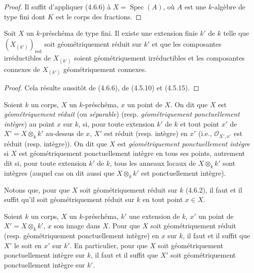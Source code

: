 \begin{proof}
Il suffit d'appliquer (4.6.6) à $X=\operatorname{Spec}(A)$, où $A$ est une
$k$-algèbre de type fini dont $K$ est le corps des fractions.
\end{proof}

\begin{corollary}[4.6.8]
\label{IV.2.4.6.8-fr}
Soit $X$ un $k$-préschéma de type fini. Il existe une extension finie $k'$ de
$k$ telle que $(X_{(k')})_{\mathrm{red}}$ soit géométriquement réduit sur $k'$
et que les composantes irréductibles de $X_{(k')}$ soient géométriquement
irréductibles et les composantes connexes de $X_{(k')}$ géométriquement
connexes.
\end{corollary}

\begin{proof}
Cela résulte aussitôt de (4.6.6), de (4.5.10) et (4.5.15).
\end{proof}

\begin{definition}[4.6.9]
\label{IV.2.4.6.9-fr}
Soient $k$ un corps, $X$ un $k$-préschéma, $x$ un point de $X$. On dit que $X$
est \emph{géométriquement réduit} (ou \emph{séparable}) (resp.
\emph{géométriquement ponctuellement intègre}) au point $x$ sur $k$, si, pour
toute extension $k'$ de $k$ et tout point $x'$ de
$X'=X\otimes_k k'$ au-dessus de $x$, $X'$ est réduit (resp. intègre) en $x'$
(i.e., $\mathcal O_{X',x'}$ est réduit (resp. intègre)). On dit que $X$ est
\emph{géométriquement ponctuellement intègre} si $X$ est géométriquement
ponctuellement intègre en tous ses points, autrement dit si, pour toute
extension $k'$ de $k$, tous les anneaux locaux de $X\otimes_k k'$ sont intègres
(auquel cas on dit aussi que $X\otimes_k k'$ est ponctuellement intègre).
\end{definition}

Notons que, pour que $X$ soit géométriquement réduit sur $k$ (4.6.2), il faut
et il suffit qu'il soit géométriquement réduit sur $k$ en tout point $x\in X$.

\begin{proposition}[4.6.10]
\label{IV.2.4.6.10-fr}
Soient $k$ un corps, $X$ un $k$-préschéma, $k'$ une extension de $k$, $x'$ un
point de $X'=X\otimes_k k'$, $x$ son image dans $X$. Pour que $X$ soit
géométriquement réduit (resp. géométriquement ponctuellement intègre) en $x$
sur $k$, il faut et il suffit que $X'$ le soit en $x'$ sur $k'$. En particulier,
pour que $X$ soit géométriquement ponctuellement intègre sur $k$, il faut et il
suffit que $X'$ soit géométriquement ponctuellement intègre sur $k'$.
\end{proposition}


